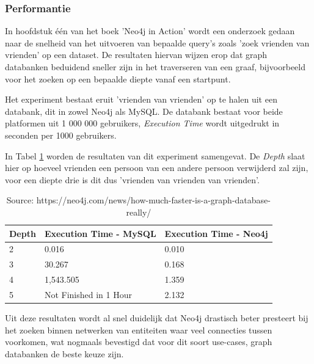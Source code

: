 \newpage
\subsubsection{Performantie}
\label{subsubsec:Performantie}

In hoofdstuk één van het boek 'Neo4j in Action' \autocite{Vukotic2014} wordt een onderzoek gedaan naar de snelheid van het uitvoeren van bepaalde query's zoals 'zoek vrienden van vrienden' op een dataset. De resultaten hiervan wijzen erop dat graph databanken beduidend sneller zijn in het traverseren van een graaf, bijvoorbeeld voor het zoeken op een bepaalde diepte vanaf een startpunt.

Het experiment bestaat eruit 'vrienden van vrienden' op te halen uit een databank, dit in zowel Neo4j als MySQL. De databank bestaat voor beide platformen uit 1 000 000 gebruikers, \textit{Execution Time} wordt uitgedrukt in seconden per 1000 gebruikers.

In Tabel \ref{tab:Neo4j - MySql Comparison} worden de resultaten van dit experiment samengevat. De \textit{Depth} slaat hier op hoeveel vrienden een persoon van een andere persoon verwijderd zal zijn, voor een diepte drie is dit dus 'vrienden van vrienden van vrienden'.

	\begin{table}
		\centering
		\begin{tabular}{|l|l|l|}
			\hline
			Depth & Execution Time - MySQL                                & Execution Time - Neo4j \\ \hline
			2     & 0.016                                                 & 0.010                  \\ \hline
			3     &  30.267 & 0.168                  \\ \hline
			4     & 1,543.505                                             & 1.359                  \\ \hline
			5     & Not Finished in 1 Hour                                & 2.132                  \\ \hline
		\end{tabular}
	\caption{\label{tab:Neo4j - MySql Comparison} Source: https://neo4j.com/news/how-much-faster-is-a-graph-database-really/}
	\end{table}


Uit deze resultaten wordt al snel duidelijk dat Neo4j drastisch beter presteert bij het zoeken binnen netwerken van entiteiten waar veel connecties tussen voorkomen, wat nogmaals bevestigd dat voor dit soort use-cases, graph databanken de beste keuze zijn.



